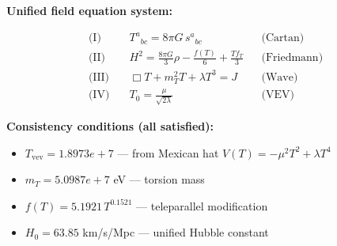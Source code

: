 
\textbf{Unified field equation system:}

\begin{align}
  \text{(I)} \quad & T^a{}_{bc} = 8\pi G \, s^a{}_{bc} && \text{(Cartan)} \\
  \text{(II)} \quad & H^2 = \frac{8\pi G}{3}\rho - \frac{f(T)}{6} + \frac{Tf_T}{3} && \text{(Friedmann)} \\
  \text{(III)} \quad & \Box T + m_T^2 T + \lambda T^3 = J && \text{(Wave)} \\
  \text{(IV)} \quad & T_0 = \frac{\mu}{\sqrt{2\lambda}} && \text{(VEV)}
\end{align}

\textbf{Consistency conditions (all satisfied):}
\begin{itemize}
  \item $T_{\text{vev}} = 1.8973e+7$ — from Mexican hat $V(T) = -\mu^2 T^2 + \lambda T^4$
  \item $m_T = 5.0987e+7$ eV — torsion mass
  \item $f(T) = 5.1921 \, T^{0.1521}$ — teleparallel modification
  \item $H_0 = 63.85$ km/s/Mpc — unified Hubble constant
\end{itemize}
